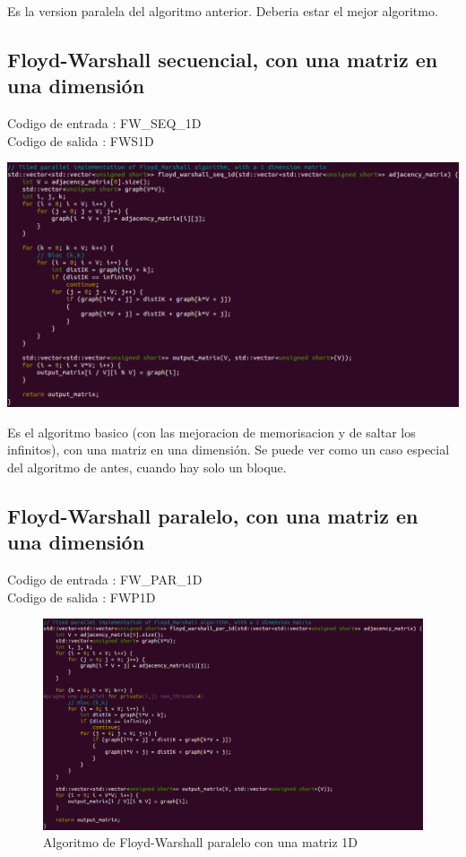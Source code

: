 \documentclass[a4paper,11pt]{article}
\begin{document}
Es la version paralela del algoritmo anterior. Deberia estar el mejor algoritmo.

\subsection{Floyd-Warshall secuencial, con una matriz en una dimensión}

\noindent Codigo de entrada : FW\_SEQ\_1D \\
Codigo de salida : FWS1D

\begin{center}
  \includegraphics[scale=0.6]{FW_SEQ_1D.png}
\end{center}

Es el algoritmo basico (con las mejoracion de memorisacion y de saltar los infinitos), con una matriz en una dimensión.
Se puede ver como un caso especial del algoritmo de antes, cuando hay solo un bloque.

\subsection{Floyd-Warshall paralelo, con una matriz en una dimensión}

\noindent Codigo de entrada : FW\_PAR\_1D \\
Codigo de salida : FWP1D

\begin{figure}[H]
\begin{center}
  \includegraphics[scale=0.6]{FW_PAR_1D.png}
  \caption{Algoritmo de Floyd-Warshall paralelo con una matriz 1D}
\end{center}
\end{figure}
\end{document}
